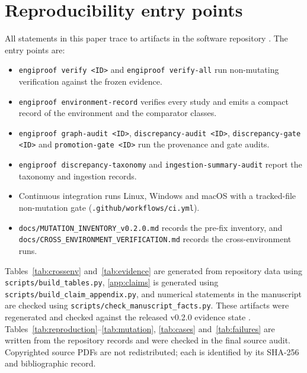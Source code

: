 \section{Reproducibility entry points}
\label{app:repro}
\begin{raggedright}
All statements in this paper trace to artifacts in the software repository \cite{EngiProof2026}. The entry points are:
\begin{itemize}[leftmargin=1.5em]
  \item \texttt{engiproof verify <ID>} and \texttt{engiproof verify-all} run non-mutating verification against the frozen evidence.
  \item \texttt{engiproof environment-record} verifies every study and emits a compact record of the environment and the comparator classes.
  \item \texttt{engiproof graph-audit <ID>}, \texttt{discrepancy-audit <ID>}, \texttt{discrepancy-gate <ID>} and \texttt{promotion-gate <ID>} run the provenance and gate audits.
  \item \texttt{engiproof discrepancy-taxonomy} and \texttt{ingestion-summary-audit} report the taxonomy and ingestion records.
  \item Continuous integration runs Linux, Windows and macOS with a tracked-file non-mutation gate (\texttt{.github/workflows/ci.yml}).
  \item \texttt{docs/MUTATION\_INVENTORY\_v0.2.0.md} records the pre-fix inventory, and \texttt{docs/CROSS\_ENVIRONMENT\_VERIFICATION.md} records the cross-environment runs.
\end{itemize}
Tables~\ref{tab:crossenv} and~\ref{tab:evidence} are generated from repository data using \texttt{scripts/\allowbreak{}build\_\allowbreak{}tables.py}, \ref{app:claims} is generated using \texttt{scripts/\allowbreak{}build\_\allowbreak{}claim\_\allowbreak{}appendix.py}, and numerical statements in the manuscript are checked using \texttt{scripts/\allowbreak{}check\_\allowbreak{}manuscript\_\allowbreak{}facts.py}. These artifacts were regenerated and checked against the released \engiproof{} v0.2.0 evidence state \cite{EngiProof2026}.
Tables~\ref{tab:reproduction}--\ref{tab:mutation}, \ref{tab:cases} and~\ref{tab:failures} are written from the repository records and were checked in the final source audit.
Copyrighted source PDFs are not redistributed; each is identified by its SHA-256 and bibliographic record.
\end{raggedright}
